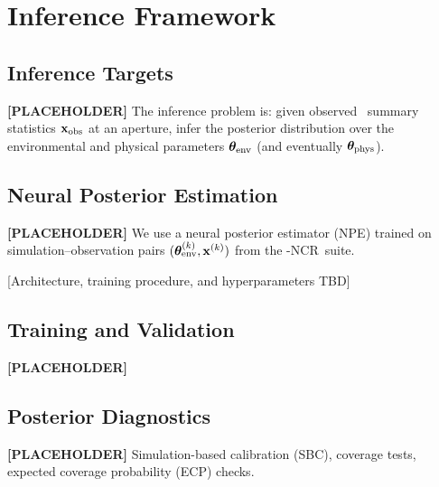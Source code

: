 \section{Inference Framework}
\label{sec:inference}

\subsection{Inference Targets}

\textbf{[PLACEHOLDER]} The inference problem is: given observed \PHANGS\ summary
statistics $\mathbf{x}_{\rm obs}$ at an aperture, infer the posterior distribution
over the environmental and physical parameters $\boldsymbol{\theta}_{\rm env}$ (and eventually $\boldsymbol{\theta}_{\rm phys}$).

\subsection{Neural Posterior Estimation}

\textbf{[PLACEHOLDER]} We use a neural posterior estimator (NPE) trained on
simulation--observation pairs $(\boldsymbol{\theta}_{\rm env}^{(k)}, \mathbf{x}^{(k)})$ from the
\TIGRESS-NCR\ suite.

[Architecture, training procedure, and hyperparameters TBD]

\subsection{Training and Validation}

\textbf{[PLACEHOLDER]}

\subsection{Posterior Diagnostics}

\textbf{[PLACEHOLDER]} Simulation-based calibration (SBC), coverage tests,
expected coverage probability (ECP) checks.

